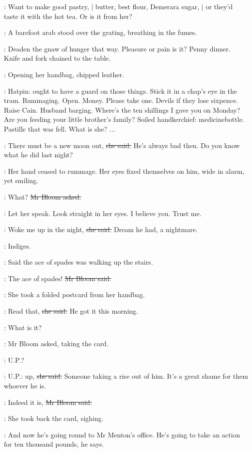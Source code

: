 \BloomInt:
Want to make good pastry, |
butter, best flour, Demerara sugar, |
or they'd taste it with the hot tea.
Or is it from her?

:
A barefoot arab stood over the grating,
breathing in the fumes.

\BloomInt:
Deaden the gnaw of hunger that way.
Pleasure or pain is it?
Penny dinner.
Knife and fork
chained to the table.

:
Opening her handbag, chipped leather.

\BloomInt:
Hatpin:
ought to have a guard on those things.
Stick it in a chap's eye in the tram.
Rummaging.
Open.
Money.
Please take one.
Devils if they lose sixpence.
Raise Cain.
Husband barging.
Where's the ten shillings I gave you on Monday?
Are you feeding your little brother's family?
Soiled handkerchief:
medicinebottle.
Pastille that was fell.
What is she?
...

\josie:
There must be a new moon out,
\sout{she said.}
He's always bad then.
Do you know what he did last night?

:
Her hand ceased to rummage.
Her eyes fixed themselves on him,
wide in alarm,
yet smiling.

\Bloom:
What?
\sout{Mr Bloom asked.}

\BloomInt:
Let her speak.
Look straight in her eyes.
I believe you.
Trust me.

\josie:
Woke me up in the night,
\sout{she said.}
Dream he had,
a nightmare.


\BloomInt:
Indiges.

\josie:
Said the ace of spades was walking up the stairs.

\Bloom:
The ace of spades!
\sout{Mr Bloom said.}

:
She took a folded postcard from her handbag.

\josie:
Read that,
\sout{she said.}
He got it this morning.

\Bloom:
What is it?

:
Mr Bloom asked,
taking the card.

\Bloom:
U.P.?

\josie:
U.P.: up,
\sout{she said.}
Someone taking a rise out of him.
It's a great shame
for them whoever he is.

\Bloom:
Indeed it is,
\sout{Mr Bloom said.}

:
She took back the card,
sighing.

\josie:
And now he's going round to Mr Menton's office.
He's going to take an action for ten thousand pounds,
he says.

